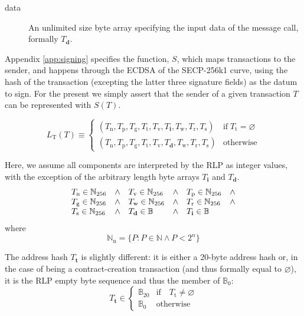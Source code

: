 \documentclass[9pt,oneside]{amsart}
\begin{document}
\begin{multicols}{2}
\begin{description}
\item[data] An unlimited size byte array specifying the input data of the message call, formally $T_{\mathbf{d}}$.
\end{description}

Appendix \ref{app:signing} specifies the function, $S$, which maps transactions to the sender, and happens through the ECDSA of the SECP-256k1 curve, using the hash of the transaction (excepting the latter three signature fields) as the datum to sign. For the present we simply assert that the sender of a given transaction $T$ can be represented with $S(T)$.

\begin{equation}
L_{\mathrm{T}}(T) \equiv \begin{cases}
(T_{\mathrm{n}}, T_{\mathrm{p}}, T_{\mathrm{g}}, T_{\mathrm{t}}, T_{\mathrm{v}}, T_{\mathbf{i}}, T_{\mathrm{w}}, T_{\mathrm{r}}, T_{\mathrm{s}}) & \text{if} \; T_{\mathrm{t}} = \varnothing\\
(T_{\mathrm{n}}, T_{\mathrm{p}}, T_{\mathrm{g}}, T_{\mathrm{t}}, T_{\mathrm{v}}, T_{\mathbf{d}}, T_{\mathrm{w}}, T_{\mathrm{r}}, T_{\mathrm{s}}) & \text{otherwise}
\end{cases}
\end{equation}

Here, we assume all components are interpreted by the RLP as integer values, with the exception of the arbitrary length byte arrays $T_{\mathbf{i}}$ and $T_{\mathbf{d}}$.
\begin{equation}
\begin{array}[t]{lclclc}
T_{\mathrm{n}} \in \mathbb{N}_{256} & \wedge & T_{\mathrm{v}} \in \mathbb{N}_{256} & \wedge & T_{\mathrm{p}} \in \mathbb{N}_{256} & \wedge \\
T_{\mathrm{g}} \in \mathbb{N}_{256} & \wedge & T_{\mathrm{w}} \in \mathbb{N}_{256} & \wedge & T_{\mathrm{r}} \in \mathbb{N}_{256} & \wedge \\
T_{\mathrm{s}} \in \mathbb{N}_{256} & \wedge & T_{\mathbf{d}} \in \mathbb{B} & \wedge & T_{\mathbf{i}} \in \mathbb{B}
\end{array}
\end{equation}
where
\begin{equation}
\mathbb{N}_{\mathrm{n}} = \{ P: P \in \mathbb{N} \wedge P < 2^n \}
\end{equation}

The address hash $T_{\mathbf{t}}$ is slightly different: it is either a 20-byte address hash or, in the case of being a contract-creation transaction (and thus formally equal to $\varnothing$), it is the RLP empty byte sequence and thus the member of $\mathbb{B}_0$:
\begin{equation}
T_{\mathbf{t}} \in \begin{cases} \mathbb{B}_{20} & \text{if} \quad T_{\mathrm{t}} \neq \varnothing \\
\mathbb{B}_{0} & \text{otherwise}\end{cases}
\end{equation}


\end{multicols}
\end{document}
